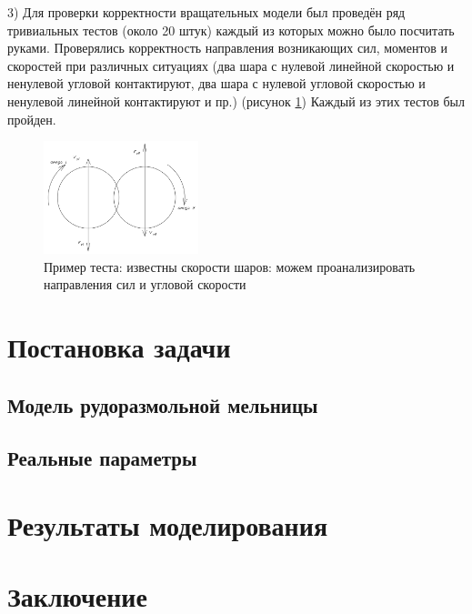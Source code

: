 \documentclass[a4paper]{article}
\begin{document}
3) Для проверки корректности вращательных модели был проведён ряд тривиальных тестов (около 20 штук) каждый из которых можно было посчитать руками. 
Проверялись корректность направления возникающих сил, моментов и скоростей при различных ситуациях (два шара с нулевой линейной скоростью и ненулевой угловой контактируют, два шара с нулевой угловой скоростью и ненулевой линейной контактируют и пр.) (рисунок \ref{pic:test_primer})
Каждый из этих тестов был пройден.

\begin{figure}[h!]
	\centering
	\label{pic:test_primer}
	\includegraphics[width=0.4\textwidth]{test_primer} 
	\caption{Пример теста: известны скорости шаров: можем проанализировать направления сил и угловой скорости}
\end{figure} 

\newpage

\section{Постановка задачи}

\subsection{Модель рудоразмольной мельницы}

\subsection{Реальные параметры}

\newpage

\section{Результаты моделирования}

\newpage

\section{Заключение}

\newpage
\end{document}
